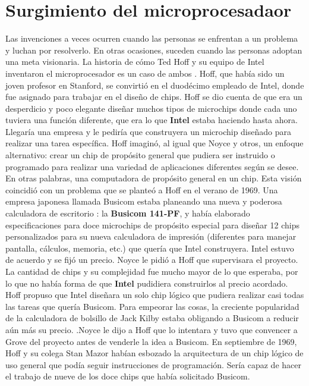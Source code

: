 \section{Surgimiento del microprocesadaor}
Las invenciones a veces ocurren cuando las personas se enfrentan a un problema y luchan por resolverlo. En otras ocasiones, suceden 
cuando las personas adoptan una meta visionaria. La historia de cómo Ted Hoff y su equipo de Intel inventaron el microprocesador es 
un caso de ambos . Hoff, que había sido un joven profesor en Stanford, se convirtió en el duodécimo empleado 
de Intel, donde fue asignado para trabajar en el diseño de chips. Hoff se dio cuenta de que era un desperdicio y poco elegante diseñar 
muchos tipos de microchips donde cada uno tuviera una función diferente,  que era lo que \textbf{Intel} estaba haciendo hasta ahora. 
Llegaría una empresa y le pediría que construyera un microchip diseñado para realizar una tarea específica. Hoff imaginó, al igual que 
Noyce y otros, un enfoque alternativo: crear un chip de propósito general que pudiera ser instruido o programado para realizar una 
variedad de aplicaciones diferentes según se desee. En otras palabras, una computadora de propósito general en un chip. 
Esta visión coincidió con un problema que se planteó a Hoff en el verano de 1969. Una empresa japonesa llamada Busicom 
estaba planeando una nueva y poderosa calculadora de escritorio : la \textbf{Busicom 141-PF}, y había elaborado especificaciones para doce microchips de propósito especial 
para diseñar 12 chips personalizados para su nueva calculadora de impresión (diferentes para manejar pantalla, cálculos, memoria, etc.) que quería que Intel construyera. 
Intel estuvo de acuerdo y se fijó un precio. Noyce le pidió a Hoff que supervisara el proyecto. La cantidad de chips y su 
complejidad fue mucho mayor de lo que esperaba, por lo que no había forma de que \textbf{Intel} pudidiera construirlos al precio acordado.
Hoff propuso que Intel diseñara un solo chip lógico que pudiera realizar casi todas las tareas que quería Busicom.
Para empeorar las cosas,  la creciente popularidad de la calculadora de bolsillo de Jack Kilby estaba obligando a Busicom a reducir aún más su precio.
.Noyce le dijo a Hoff que lo intentara y  tuvo que convencer a Grove del proyecto antes de venderle la idea a Busicom. En septiembre de 1969, Hoff y 
su colega Stan Mazor habían esbozado la arquitectura de un chip lógico de uso general que podía seguir instrucciones de programación. 
Sería capaz de hacer el trabajo de nueve de los doce chips que había solicitado Busicom.

